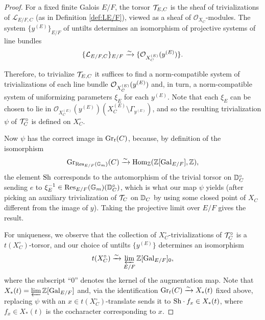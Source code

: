 \begin{proof}
    For a fixed finite Galois $E/F$, the torsor $\mathcal{T}_{E,C}$ is the sheaf of trivializations of $\mathcal{L}_{E/F,C}$ (as in Definition \ref{def:LE/F}), viewed as a sheaf of $\mathcal{O}_{X_{C}}$-modules. The system $\{y^{(E)}\}_{E/F}$ of untilts determines an isomorphism of projective systems of line bundles 
    \begin{equation*}
    \{\mathcal{L}_{E/F,C}\}_{E/F} \xrightarrow{\sim} \{\mathcal{O}_{X^{(E)}_{C}}(y^{(E)})\}.
    \end{equation*}
    
    Therefore, to trivialize $\mathcal{T}_{E,C}$ it suffices to find a norm-compatible system of trivializations of each line bundle $\mathcal{O}_{X^{(E)}_{C}}(y^{(E)})$ and, in turn, a norm-compatible system of uniformizing parameters $\xi_{E}$ for each $y^{(E)}$. Note that each $\xi_{E}$ can be chosen to lie in $\mathcal{O}_{X_{C}^{(E)}}(y^{(E)})(X^{(E)}_{C} \setminus \Gamma_{y^{(E)}})$, and so the resulting trivialization $\psi$ of $\mathcal{T}_{C}^{\circ}$ is defined on $X_{C}^{\circ}$. 

    Now $\psi$ has the correct image in $\textnormal{Gr}_{t}(C)$, because, by definition of the isomorphism 
    \begin{equation*}
    \textnormal{Gr}_{\mathrm{Res}_{E/F}(\mathbb{G}_{m})}(C)\xrightarrow{\sim} \mathrm{Hom}_{\mathbb{Z}}(\mathbb{Z}[\mathrm{Gal}_{E/F}],\mathbb{Z}),
    \end{equation*}
    the element $\textnormal{Sh}$ corresponds to the automorphism of the trivial torsor on $\mathbb D_{C}^{\circ}$ sending $e$ to $\xi_{E}^{-1} \in \mathrm{Res}_{E/F}(\mathbb{G}_{m})(\mathbb D_{C}^{\circ})$, which is what our map $\psi$ yields (after picking an auxiliary trivialization of $\mathcal{T}_{C}$ on $\mathbb D_{C}$ by using some closed point of $X_{C}$ different from the image of $y$). Taking the projective limit over $E/F$ gives the result.

   For uniqueness, we observe that the collection of $X_{C}^{\circ}$-trivializations of $\mathcal{T}_{C}^{\circ}$ is a $t(X_{C}^{\circ})$-torsor, and our choice of untilts $\{y^{(E)}\}$ determines an isomorphism 
   \begin{equation*}
       t(X_{C}^{\circ}) \xrightarrow{\sim} \varprojlim_{E/F} \mathbb{Z}[\mathrm{Gal}_{E/F}]_{0},
   \end{equation*}
   where the subscript ``$0$'' denotes the kernel of the augmentation map. Note that $X_{*}(t) = \varprojlim \mathbb{Z}[\mathrm{Gal}_{E/F}]$ and, via the identification $\textnormal{Gr}_{t}(C) \xrightarrow{\sim} X_{*}(t)$ fixed above, replacing $\psi$ with an $x\in t(X_{C}^{\circ})$-translate sends it to $\textnormal{Sh} \cdot f_{x} \in X_{*}(t)$, where $f_{x} \in X_{*}(t)$ is the cocharacter corresponding to $x$.
\end{proof}

